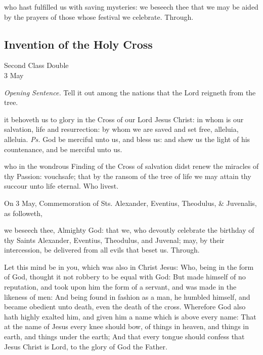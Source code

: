 \postcommunion
{} who hast fulfilled us with saving mysteries: we beseech thee that we may be aided by the prayers of those whose festival we celebrate. Through.


\subsection{Invention of the Holy Cross}
\begin{inhead}
    {Second Class Double\\
3 May}
\end{inhead}
\par\noindent
\textit{Opening Sentence.} Tell it out among the nations that the Lord reigneth from the tree.\par

\introit
{} it behoveth us to glory in the Cross of our Lord Jesus Christ: in whom is our salvation, life and resurrection: by whom we are saved and set free, alleluia, alleluia. \textit{Ps.} God be merciful unto us, and bless us: and shew us the light of his countenance, and be merciful unto us.

\collect
{} who in the wondrous Finding of the Cross of salvation didst renew the miracles of thy Passion: vouchsafe; that by the ransom of the tree of life we may attain thy succour unto life eternal. Who livest.
\begin{rubric}
	 On 3 May, Commemoration of Sts. Alexander, Eventius, Theodulus, \& Juvenalis, as followeth,
\end{rubric}
 we beseech thee, Almighty God: that we, who devoutly celebrate the birthday of thy Saints Alexander, Eventius, Theodulus, and Juvenal; may, by their intercession, be delivered from all evils that beset us. Through.

 Let this mind be in you, which was also in Christ Jesus: Who, being in the form of God, thought it not robbery to be equal with God: But made himself of no reputation, and took upon him the form of a servant, and was made in the likeness of men: And being found in fashion as a man, he humbled himself, and became obedient unto death, even the death of the cross. Wherefore God also hath highly exalted him, and given him a name which is above every name: That at the name of Jesus every knee should bow, of things in heaven, and things in earth, and things under the earth; And that every tongue should confess that Jesus Christ is Lord, to the glory of God the Father.

